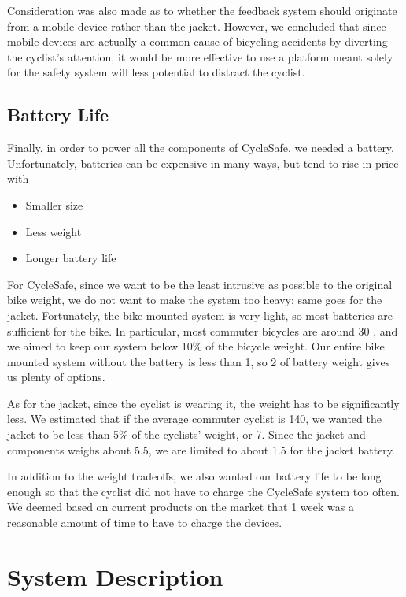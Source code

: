 \documentclass[journal]{IEEEtran}
\begin{document}
Consideration was also made as to whether the feedback system should originate from a mobile device rather than the jacket. However, we concluded that since mobile devices are actually a common cause of bicycling accidents by diverting the cyclist's attention, it would be more effective to use a platform meant solely for the safety system will less potential to distract the cyclist.

\subsection{Battery Life}

Finally, in order to power all the components of CycleSafe, we needed a battery. Unfortunately, batteries can be expensive in many ways, but tend to rise in price with
\begin{itemize}
    \item Smaller size
    \item Less weight
    \item Longer battery life
\end{itemize}
For CycleSafe, since we want to be the least intrusive as possible to the original bike weight, we do not want to make the system too heavy; same goes for the jacket. Fortunately, the bike mounted system is very light, so most batteries are sufficient for the bike. In particular, most commuter bicycles are around \SI{30}{\lb} \cite{bicycle_weight}, and we aimed to keep our system below 10\% of the bicycle weight. Our entire bike mounted system without the battery is less than \SI{1}{\lb}, so \SI{2}{\lb} of battery weight gives us plenty of options.

As for the jacket, since the cyclist is wearing it, the weight has to be significantly less. We estimated that if the average commuter cyclist is \SI{140}{\lb}, we wanted the jacket to be less than 5\% of the cyclists' weight, or \SI{7}{\lb}. Since the jacket and components weighs about \SI{5.5}{\lb}, we are limited to about \SI{1.5}{\lb} for the jacket battery.

In addition to the weight tradeoffs, we also wanted our battery life to be long enough so that the cyclist did not have to charge the CycleSafe system too often. We deemed based on current products on the market \cite{bicycle_lights_cygolite, bicycle_lights_niterider} that 1 week was a reasonable amount of time to have to charge the devices.

\section{System Description}
\end{document}
